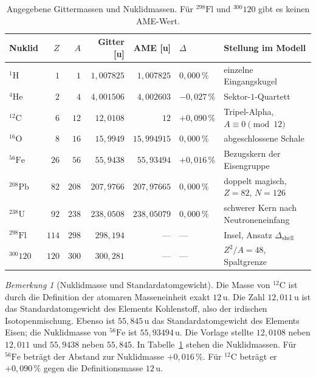 \documentclass[11pt,a4paper]{article}
\theoremstyle{definition}
\theoremstyle{remark}
\newtheorem{bemerkung}{Bemerkung}[section]
\begin{document}
\begin{table}[ht]
\centering
\caption{Angegebene Gittermassen und Nuklidmassen. Für \(^{298}\mathrm{Fl}\) und \(^{300}120\) gibt es keinen AME-Wert.}
\label{tab:massen}
\medskip
\small
\begin{tabular}{@{}lrrrrlp{4.6cm}@{}}
\toprule
Nuklid & \(Z\) & \(A\) & Gitter [u] & AME [u] & \(\Delta\) & Stellung im Modell \\
\midrule
\(^{1}\mathrm{H}\) & \(1\) & \(1\) & \(1{,}007825\) & \(1{,}007825\) & \(0{,}000\,\%\) & einzelne Eingangskugel \\
\(^{4}\mathrm{He}\) & \(2\) & \(4\) & \(4{,}001506\) & \(4{,}002603\) & \(-0{,}027\,\%\) & Sektor-\(1\)-Quartett \\
\(^{12}\mathrm{C}\) & \(6\) & \(12\) & \(12{,}0108\) & \(12\) & \(+0{,}090\,\%\) & Tripel-Alpha, \(A\equiv 0\pmod{12}\) \\
\(^{16}\mathrm{O}\) & \(8\) & \(16\) & \(15{,}9949\) & \(15{,}994915\) & \(0{,}000\,\%\) & abgeschlossene Schale \\
\(^{56}\mathrm{Fe}\) & \(26\) & \(56\) & \(55{,}9438\) & \(55{,}93494\) & \(+0{,}016\,\%\) & Bezugskern der Eisengruppe \\
\(^{208}\mathrm{Pb}\) & \(82\) & \(208\) & \(207{,}9766\) & \(207{,}97665\) & \(0{,}000\,\%\) & doppelt magisch, \(Z=82\), \(N=126\) \\
\(^{238}\mathrm{U}\) & \(92\) & \(238\) & \(238{,}0508\) & \(238{,}05079\) & \(0{,}000\,\%\) & schwerer Kern nach Neutroneneinfang \\
\(^{298}\mathrm{Fl}\) & \(114\) & \(298\) & \(298{,}194\) & --- & --- & Insel, Ansatz \(\Delta_{\mathrm{shell}}\) \\
\(^{300}120\) & \(120\) & \(300\) & \(300{,}281\) & --- & --- & \(Z^2/A=48\), Spaltgrenze \\
\bottomrule
\end{tabular}
\end{table}

\begin{bemerkung}[Nuklidmasse und Standardatomgewicht]
Die Masse von \(^{12}\mathrm{C}\) ist durch die Definition der atomaren Masseneinheit exakt \(12\,\mathrm{u}\). Die Zahl \(12{,}011\,\mathrm{u}\) ist das Standardatomgewicht des Elements Kohlenstoff, also der irdischen Isotopenmischung. Ebenso ist \(55{,}845\,\mathrm{u}\) das Standardatomgewicht des Elements Eisen; die Nuklidmasse von \(^{56}\mathrm{Fe}\) ist \(55{,}93494\,\mathrm{u}\). Die Vorlage stellte \(12{,}0108\) neben \(12{,}011\) und \(55{,}9438\) neben \(55{,}845\). In Tabelle~\ref{tab:massen} stehen die Nuklidmassen. Für \(^{56}\mathrm{Fe}\) beträgt der Abstand zur Nuklidmasse \(+0{,}016\,\%\). Für \(^{12}\mathrm{C}\) beträgt er \(+0{,}090\,\%\) gegen die Definitionsmasse \(12\,\mathrm{u}\).
\end{bemerkung}
\end{document}
